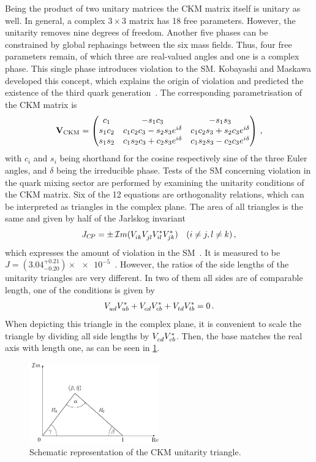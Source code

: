 Being the product of two unitary matrices the CKM matrix itself is unitary as
well. In general, a complex $3\times3$ matrix has 18 free parameters. However,
the unitarity removes nine degrees of freedom. Another five phases can
be constrained by global rephasings between the six mass fields. Thus, four free
parameters remain, of which three are real-valued angles and one is a complex
phase. This single phase introduces \CP violation to the SM. Kobayashi and
Maskawa developed this concept, which explains the origin of \CP violation and
predicted the existence of the third quark generation~\cite{Kobayashi:1973fv}.
The corresponding parametrisation of the CKM matrix is
\begin{align}
\mathbf{V}_{\text{CKM}} =
\begin{pmatrix}
c_1 & -s_1c_3 & -s_1s_3 \\
s_1c_2 & c_1c_2c_3 - s_2s_3e^{i\delta} & c_1c_2s_3 + s_2c_3e^{i\delta} \\
s_1s_2 & c_1s_2c_3 + c_2s_3e^{i\delta} & c_1s_2s_3 - c_2c_3e^{i\delta}
\end{pmatrix}
\,,
\end{align}
with $c_i$ and $s_i$ being shorthand for the cosine respectively sine of the
three Euler angles, and $\delta$ being the irreducible phase. Tests of the SM
concerning \CP violation in the quark mixing sector are performed by examining
the unitarity conditions of the CKM matrix. Six of the 12 equations are
orthogonality relations, which can be interpreted as triangles in the complex
plane. The area of all triangles is the same and given by half of the Jarlskog
invariant
\begin{align}
	J_{{C\!P}} = \pm\,\mathcal{I}m (V_{ik}^{}V_{jl}^{}V_{il}^{\ast}V_{jk}^{\ast}) \quad (i \neq j, l \neq k)\,,
\end{align}
which expresses the amount of \CP violation in the
SM~\cite{Jarlskog:1985ht,*Jarlskog:1985cw}. It is measured to be $J = (3.04
^{+0.21}_{-0.20}) \times\num{e-5}$~\cite{PDG2016}. However, the ratios of the
side lengths of the unitarity triangles are very different. In two of them all
sides are of comparable length, one of the conditions is given by
\begin{align}
	{\ensuremath{V_{{u}{d}}^{}}}{\ensuremath{V_{{u}{b}}^\ast}} + {V_{{c}{d}}^{}}{V_{{c}{b}}^\ast} + {V_{{t}{d}}^{}}{V_{{t}{b}}^\ast} = 0\,.
\end{align}
When depicting this triangle in the complex plane, it is convenient to scale the
triangle by dividing all side lengths by ${V_{{c}{d}}^{}}{V_{{c}{b}}^\ast}$. Then, the base matches
the real axis with length one, as can be seen in
\cref{fig:cpviolation:ckmtriangle}.
\begin{figure}[htb]
\centering
\includegraphics[width=0.5\textwidth]{03-CPViolation/tikz/pdf/CKMtriangle.pdf}
\caption{Schematic representation of the CKM unitarity triangle.}
\label{fig:cpviolation:ckmtriangle}
\end{figure}
